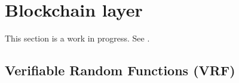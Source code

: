 \section{Blockchain layer}
\label{sec:chain}

\newcommand{\leteq}{\ensuremath{\mathrel{\mathop:}=}}

\newcommand{\Seed}{\type{Seed}}
\newcommand{\seedOp}{\star}
\newcommand{\Proof}{\type{Proof}}
\newcommand{\Seedl}{\mathsf{Seed_\ell}}
\newcommand{\Seedn}{\mathsf{Seed_n}}
\newcommand{\slotToSeed}[1]{\fun{slotToSeed}~ \var{#1}}

\newcommand{\Bool}{\type{Bool}}
\newcommand{\T}{\type{T}}
\newcommand{\vrf}[3]{\fun{vrf}_{#1} ~ #2 ~ #3}
\newcommand{\verifyVrf}[4]{\fun{verifyVrf}_{#1} ~ #2 ~ #3 ~#4}

\newcommand{\HashBlock}{\type{HashBlock}}
\newcommand{\hashBlock}[1]{\fun{hashBlock}~ \var{#1}}
\newcommand{\BHeader}{\type{BHeader}}
\newcommand{\BHBody}{\type{BHBody}}

\newcommand{\header}[1]{\fun{header}~\var{#1}}
\newcommand{\hbody}[1]{\fun{hbody}~\var{#1}}
\newcommand{\hsig}[1]{\fun{hsig}~\var{#1}}
\newcommand{\bprev}[1]{\fun{bprev}~\var{#1}}
\newcommand{\bhash}[1]{\fun{bhash}~\var{#1}}
\newcommand{\bsig}[1]{\fun{bsig}~\var{#1}}
\newcommand{\bissuer}[1]{\fun{bissuer}~\var{#1}}
\newcommand{\bseedl}[1]{\fun{bseed}_{\ell}~\var{#1}}
\newcommand{\bprfn}[1]{\fun{bprf}_{n}~\var{#1}}
\newcommand{\bseedn}[1]{\fun{bseed}_{n}~\var{#1}}
\newcommand{\bprfl}[1]{\fun{bprf}_{\ell}~\var{#1}}

\newcommand{\BHeaderEnv}{\type{BHeaderEnv}}
\newcommand{\NewEpochEnv}{\type{NewEpochEnv}}
\newcommand{\NewEpochState}{\type{NewEpochState}}
\newcommand{\BBodyEnv}{\type{BBodyEnv}}
\newcommand{\BBodyState}{\type{BBodyState}}
\newcommand{\ChainEnv}{\type{ChainEnv}}
\newcommand{\ChainState}{\type{ChainState}}
\newcommand{\ChainSig}{\type{ChainSig}}


\begin{note}
  This section is a work in progress.
  See \cite{ouroboros_praos}.
\end{note}

\subsection{Verifiable Random Functions (VRF)}
\label{sec:defs-vrf}

